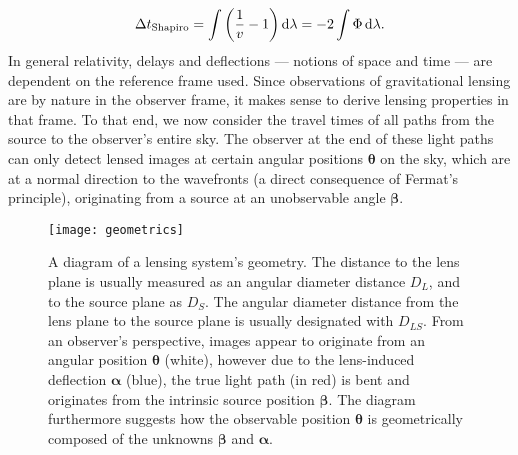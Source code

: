 %
%
\begin{equation}\eqlbl{shapiro}%
  \Delta t_{\text{Shapiro}} = \int \left(\frac{1}{v}-1\right)\mathrm{d}\lambda
   = -2\int\Phi\,\mathrm{d}\lambda.
\end{equation}%
%
In general relativity, delays and deflections --- notions of space and time ---
are dependent on the reference frame used.  Since observations of gravitational
lensing are by nature in the observer frame, it makes sense to derive lensing
properties in that frame.  To that end, we now consider the travel times of all
paths from the source to the observer's entire sky.  The observer at the end of these light paths can only detect
lensed images at certain angular positions $\bm\theta$ on the sky, which are at
a normal direction to the wavefronts (a direct consequence of Fermat's
principle), originating from a source at an unobservable angle $\bm\beta$.

\begin{figure}[h]%
  \centering%
  \texttt{[image: geometrics]}%
  \caption[Lensing geometrics]{A diagram of a lensing system's geometry.  The
  distance to the lens plane is usually measured as an angular diameter distance
  $D_{L}$, and to the source plane as $D_{S}$.  The angular diameter distance
  from the lens plane to the source plane is usually designated with $D_{LS}$.
  From an observer's perspective, images appear to originate from an angular
  position $\bm\theta$ (white), however due to the lens-induced deflection
  $\bm\alpha$ (blue), the true light path (in red) is bent and originates from
  the intrinsic source position $\bm\beta$.  The diagram furthermore suggests
  how the observable position $\bm\theta$ is geometrically composed of the
  unknowns $\bm\beta$ and $\bm\alpha$.}%
\end{figure}%

